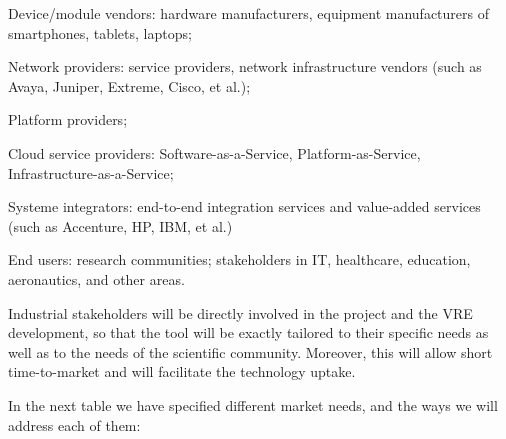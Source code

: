 \begin{compactenum}
\item Device/module vendors: hardware manufacturers, equipment
manufacturers of smartphones, tablets, laptops;
\item Network providers: service providers, network infrastructure
vendors (such as Avaya, Juniper, Extreme, Cisco, et al.);
\item Platform providers;
\item Cloud service providers: Software-as-a-Service,
Platform-as-Service, Infrastructure-as-a-Service;
\item Systeme integrators: end-to-end integration services and
value-added services (such as Accenture, HP, IBM, et al.)
\item End users: research communities; stakeholders in IT, healthcare, 
education, aeronautics, and other areas.
\end{compactenum}
Industrial stakeholders will be directly involved in the project and
the VRE development, so that the tool will be exactly tailored to their
specific needs as well as to the needs of the scientific community.
Moreover, this will allow short time-to-market and will facilitate
the technology uptake.

In the next table we have specified different market needs, and the
ways we will address each of them:


